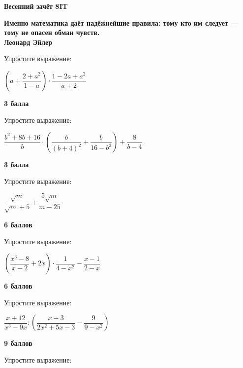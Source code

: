 \centerline{\bf \Huge Весенний зачёт 8IT}

\begin{flushright}
        \scriptsize{\textbf{Именно математика даёт надёжнейшие правила: тому кто им следует — тому не опасен обман чувств.\\
         Леонард Эйлер}}
        
\end{flushright}

 Упростите выражение:

$\left(a+\dfrac{2+a^2}{1-a}\right) \cdot \dfrac{1-2 a+a^2}{a+2}$

\begin{flushright} \textbf{3 балла}\\ 
\end{flushright}

 Упростите выражение:

$\dfrac{b^2+8 b+16}{b} \cdot\left(\dfrac{b}{(b+4)^2}+\dfrac{b}{16-b^2}\right)+\dfrac{8}{b-4}$

\begin{flushright} \textbf{3 балла}\\ 
\end{flushright}

 Упростите выражение:

$\dfrac{\sqrt{m}}{\sqrt{m}+5}+\dfrac{5 \sqrt{m}}{m-25}$

\begin{flushright} \textbf{6 баллов}\\ 
\end{flushright}

 Упростите выражение:

$\left(\dfrac{x^3-8}{x-2}+2 x\right) \cdot \dfrac{1}{4-x^2}-\dfrac{x-1}{2-x}$

\begin{flushright} \textbf{6 баллов}\\ 
\end{flushright}

 Упростите выражение:

$\dfrac{x+12}{x^3-9 x}:\left(\dfrac{x-3}{2 x^2+5 x-3}-\dfrac{9}{9-x^2}\right)$

\begin{flushright} \textbf{9 баллов}\\ 
\end{flushright}

 Упростите выражение:

